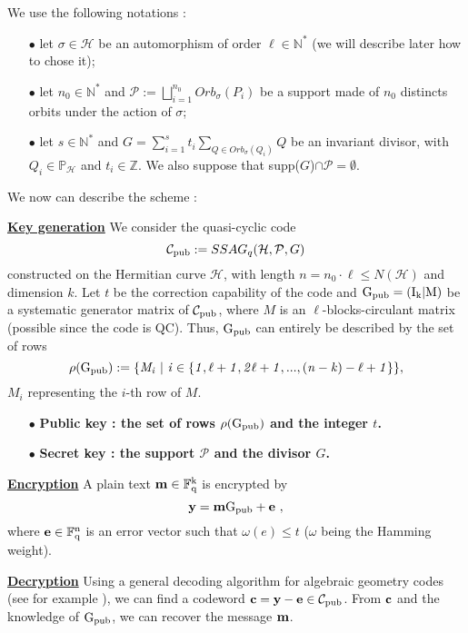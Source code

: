 \documentclass[10pt]{article}
\newcommand{\s}{\vspace{0.3cm}}
\newcommand{\cd}{\cdot}
\newcommand{\N}{\mathbb{N}}
\newcommand{\Z}{\mathbb{Z}}
\newcommand{\PP}{\mathbb{P}}
\newcommand{\fq}{\mathbb{F}_q}
\newcommand{\w}{\omega}
\newcommand{\PR}{\mathcal{P}}
\begin{document}
\s

We use the following notations : 
\begin{enumerate}
\item[$\bullet$] let $\sigma \in \mathcal{H}$ be an automorphism of order $\ell \in \N^*$ (we will describe later how to chose it);
\item[$\bullet$] let $n_0 \in \N^* $ and $\PR := \bigsqcup\limits_{i=1}^{n_0} Orb_{\sigma}(P_i)$ be a support made of $n_0$ distincts orbits under the action of $\sigma$;
\item[$\bullet$] let $s \in \N^*$ and $G = \sum\limits_{i=1}^s t_i \sum\limits_{Q \in Orb_{\sigma}(Q_i)} Q$ be an invariant divisor, with $Q_i \in \PP_{\mathcal{H}}$ and $t_i \in \Z$. We also suppose that supp($G$)$\cap \PR = \emptyset$.
\end{enumerate}

We now can describe the scheme :

\s 

\underline{\bf{Key generation}} We consider the quasi-cyclic code 
\[\mathcal{C}_{\rm pub} := SSAG_q(\mathcal{H},\PR,G)\]
constructed on the Hermitian curve $\mathcal{H}$, with length $n=n_0 \cd \ell\leq N(\mathcal{H})$ and dimension $k$. Let $t$ be the correction capability of the code and $\rm G_{pub} = (I_k | M)$ be a systematic generator matrix of $\mathcal{C}_{\rm pub}$, where $M$ is an $\ell$-blocks-circulant matrix (possible since the code is QC). Thus, $\rm G_{pub}$ can entirely be described by the set of rows
\[\rho(\rm G_{pub}) \it := \{M_i \ | \ i \in \{1,\ell+1,2\ell+1,...,(n-k)-\ell+1\}\},\]
$M_i$ representing the $i$-th row of $M$. 

\begin{enumerate}
\item[$\bullet$] \bf{Public key} : \rm the set of rows $\rho(\rm G_{pub})$ and the integer $t$.
\item[$\bullet$] \bf{Secret key} : \rm the support $\PR$ and the divisor $G$.
\end{enumerate}

\s

\underline{\bf{Encryption}} A plain text $\bf{m} \rm \in \fq^k$ is encrypted by 
\[ \bf{y} \rm = \bf{m} \it \rm G_{pub} \it + \bf{e} \ ,\]
where $\bf{e} \rm \in \fq^n$ is an error vector such that $\w(e) \leq t$ ($\w$ being the Hamming weight).

\s

\underline{\bf{Decryption}} Using a general decoding algorithm for algebraic geometry codes (see for example \cite{THRP}), we can find a codeword $\bf{c} \rm = \rm \bf{y - e} \rm \in \mathcal{C}_{\rm pub}$. From $\bf{c}$ and the knowledge of $\rm G_{pub}$, we can recover the message $\bf{m}$.
\end{document}
